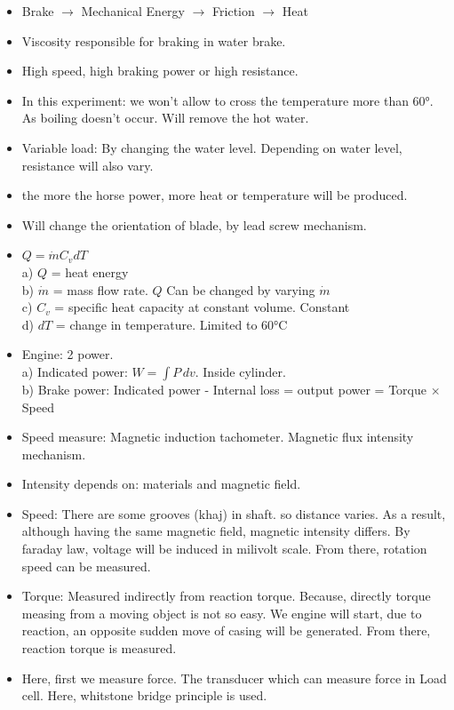 \documentclass{article}
\begin{document}
\begin{multicols}{2}
\begin{itemize}
    \item Brake $\rightarrow$ Mechanical Energy $\rightarrow$ Friction $\rightarrow$ Heat 
    \item Viscosity responsible for braking in water brake. 
    \item High speed, high braking power or high resistance.
    \item In this experiment: we won't allow to cross the temperature more than 60°. As boiling doesn't occur. Will remove the hot water.
    \item Variable load: By changing the water level. Depending on water level, resistance will also vary. 
    \item the more the horse power, more heat or temperature will be produced. 
    \item Will change the orientation of blade, by lead screw mechanism. 
    \item $Q = \dot{m} C_v dT$\\
    a) $Q$ = heat energy\\
    b) $\dot{m}$ = mass flow rate. $Q$ Can be changed by varying $\dot{m}$\\
    c) $C_v$ = specific heat capacity at constant volume. Constant\\
    d) $dT$ = change in temperature. Limited to 60°C\\
    \item Engine: 2 power.\\
    a) Indicated power: $W = \int P  \,dv $. Inside cylinder.\\
    b) Brake power: Indicated power - Internal loss = output power = Torque $\times$ Speed\\
    \item Speed measure: Magnetic induction tachometer. Magnetic flux intensity mechanism. 
    \item Intensity depends on: materials and magnetic field.
    \item Speed: There are some grooves (khaj) in shaft. so distance varies. As a result, although having the same magnetic field, magnetic intensity differs. By faraday law, voltage will be induced in milivolt scale. From there, rotation speed can be measured.
    \item Torque: Measured indirectly from reaction torque. Because, directly torque measing from a moving object is not so easy. We engine will start, due to reaction, an opposite sudden move of casing will be generated. From there, reaction torque is measured. 
    \item Here, first we measure force. The transducer which can measure force in Load cell. Here, whitstone bridge principle is used. 

\end{itemize}
\end{multicols}
\end{document}
